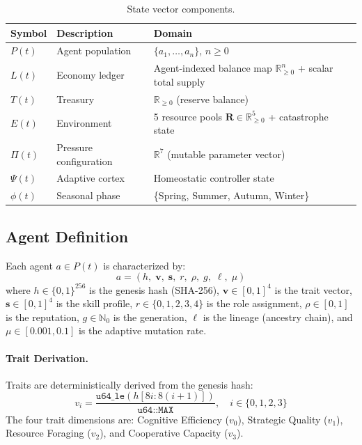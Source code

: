\documentclass[11pt,a4paper]{article}
\begin{document}
\begin{table}[H]
\centering
\caption{State vector components.}
\begin{tabular}{@{}llp{7cm}@{}}
\toprule
Symbol & Description & Domain \\
\midrule
$P(t)$ & Agent population & $\{a_1, \ldots, a_n\}$, $n \geq 0$ \\
$L(t)$ & Economy ledger & Agent-indexed balance map $\mathbb{R}_{\geq 0}^n$ + scalar total supply \\
$T(t)$ & Treasury & $\mathbb{R}_{\geq 0}$ (reserve balance) \\
$E(t)$ & Environment & 5 resource pools $\mathbf{R} \in \mathbb{R}_{\geq 0}^5$ + catastrophe state \\
$\Pi(t)$ & Pressure configuration & $\mathbb{R}^7$ (mutable parameter vector) \\
$\Psi(t)$ & Adaptive cortex & Homeostatic controller state \\
$\phi(t)$ & Seasonal phase & \{Spring, Summer, Autumn, Winter\} \\
\bottomrule
\end{tabular}
\end{table}

\subsection{Agent Definition}

Each agent $a \in P(t)$ is characterized by:
\begin{equation}
  a = (h,\; \mathbf{v},\; \mathbf{s},\; r,\; \rho,\; g,\; \ell,\; \mu)
\end{equation}
where $h \in \{0,1\}^{256}$ is the genesis hash (SHA-256), $\mathbf{v} \in [0,1]^4$ is the trait vector, $\mathbf{s} \in [0,1]^4$ is the skill profile, $r \in \{0,1,2,3,4\}$ is the role assignment, $\rho \in [0,1]$ is the reputation, $g \in \mathbb{N}_0$ is the generation, $\ell$ is the lineage (ancestry chain), and $\mu \in [0.001, 0.1]$ is the adaptive mutation rate.

\paragraph{Trait Derivation.}
Traits are deterministically derived from the genesis hash:
\begin{equation}
  v_i = \frac{\texttt{u64\_le}(h[8i : 8(i+1)])}{\texttt{u64::MAX}}, \quad i \in \{0, 1, 2, 3\}
\end{equation}
The four trait dimensions are: Cognitive Efficiency ($v_0$), Strategic Quality ($v_1$), Resource Foraging ($v_2$), and Cooperative Capacity ($v_3$).
\end{document}
